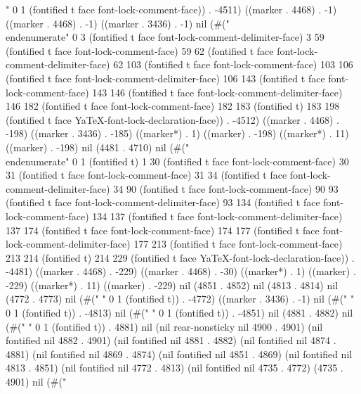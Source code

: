 " 0 1 (fontified t face font-lock-comment-face)) . -4511) ((marker . 4468) . -1) ((marker . 4468) . -1) ((marker . 3436) . -1) nil (#("%
 \\end{enumerate}" 0 3 (fontified t face font-lock-comment-delimiter-face) 3 59 (fontified t face font-lock-comment-face) 59 62 (fontified t face font-lock-comment-delimiter-face) 62 103 (fontified t face font-lock-comment-face) 103 106 (fontified t face font-lock-comment-delimiter-face) 106 143 (fontified t face font-lock-comment-face) 143 146 (fontified t face font-lock-comment-delimiter-face) 146 182 (fontified t face font-lock-comment-face) 182 183 (fontified t) 183 198 (fontified t face YaTeX-font-lock-declaration-face)) . -4512) ((marker . 4468) . -198) ((marker . 3436) . -185) ((marker*) . 1) ((marker) . -198) ((marker*) . 11) ((marker) . -198) nil (4481 . 4710) nil (#("	%
 \\end{enumerate}" 0 1 (fontified t) 1 30 (fontified t face font-lock-comment-face) 30 31 (fontified t face font-lock-comment-face) 31 34 (fontified t face font-lock-comment-delimiter-face) 34 90 (fontified t face font-lock-comment-face) 90 93 (fontified t face font-lock-comment-delimiter-face) 93 134 (fontified t face font-lock-comment-face) 134 137 (fontified t face font-lock-comment-delimiter-face) 137 174 (fontified t face font-lock-comment-face) 174 177 (fontified t face font-lock-comment-delimiter-face) 177 213 (fontified t face font-lock-comment-face) 213 214 (fontified t) 214 229 (fontified t face YaTeX-font-lock-declaration-face)) . -4481) ((marker . 4468) . -229) ((marker . 4468) . -30) ((marker*) . 1) ((marker) . -229) ((marker*) . 11) ((marker) . -229) nil (4851 . 4852) nil (4813 . 4814) nil (4772 . 4773) nil (#("	" 0 1 (fontified t)) . -4772) ((marker . 3436) . -1) nil (#("	" 0 1 (fontified t)) . -4813) nil (#("	" 0 1 (fontified t)) . -4851) nil (4881 . 4882) nil (#("	" 0 1 (fontified t)) . 4881) nil (nil rear-nonsticky nil 4900 . 4901) (nil fontified nil 4882 . 4901) (nil fontified nil 4881 . 4882) (nil fontified nil 4874 . 4881) (nil fontified nil 4869 . 4874) (nil fontified nil 4851 . 4869) (nil fontified nil 4813 . 4851) (nil fontified nil 4772 . 4813) (nil fontified nil 4735 . 4772) (4735 . 4901) nil (#("
